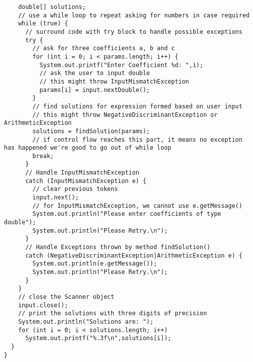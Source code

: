 \begin{enumerate}
\begin{lstlisting}
    double[] solutions;
    // use a while loop to repeat asking for numbers in case required
    while (true) {
      // surround code with try block to handle possible exceptions
      try {
        // ask for three coefficients a, b and c
        for (int i = 0; i < params.length; i++) {
          System.out.printf("Enter Coefficient %d: ",i);
          // ask the user to input double
          // this might throw InputMismatchException
          params[i] = input.nextDouble();
        }
        // find solutions for expression formed based on user input
        // this might throw NegativeDiscriminantException or ArithmeticException
        solutions = findSolution(params);
        // if control flow reaches this part, it means no exception has happened we're good to go out of while loop
        break;
      }
      // Handle InputMismatchException
      catch (InputMismatchException e) {
        // clear previous tokens
        input.next();
        // for InputMismatchException, we cannot use e.getMessage()
        System.out.println("Please enter coefficients of type double");
        System.out.println("Please Retry.\n");
      }
      // Handle Exceptions thrown by method findSolution()
      catch (NegativeDiscriminantException|ArithmeticException e) {
        System.out.println(e.getMessage());
        System.out.println("Please Retry.\n");
      }
    }
    // close the Scanner object
    input.close();
    // print the solutions with three digits of precision
    System.out.println("Solutions are: ");
    for (int i = 0; i < solutions.length; i++)
      System.out.printf("%.3f\n",solutions[i]);
  }
}
\end{lstlisting}
\end{enumerate}